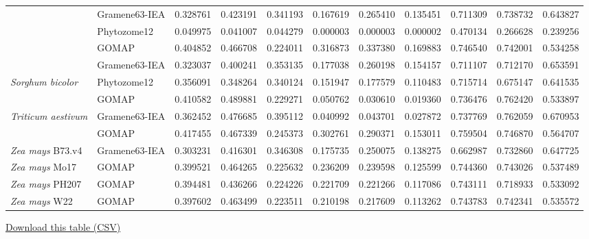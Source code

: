 \documentclass[utf8]{frontiersSCNS}
\begin{document}
\begin{table}[t]
{\begin{threeparttable}
\begin{tabular}{llrr>{}r|rr>{}r|rrr}
 & Gramene63-IEA & 0.328761 & 0.423191 & 0.341193 & 0.167619 & 0.265410 & 0.135451 & 0.711309 & 0.738732 & 0.643827\\

\rowcolor{gray!6}  \multirow{-3}{*}{\raggedright\arraybackslash \textit{Oryza sativa}} & Phytozome12 & 0.049975 & 0.041007 & 0.044279 & 0.000003 & 0.000003 & 0.000002 & 0.470134 & 0.266628 & 0.239256\\
\cmidrule{1-11}
 & GOMAP & 0.404852 & 0.466708 & 0.224011 & 0.316873 & 0.337380 & 0.169883 & 0.746540 & 0.742001 & 0.534258\\

\rowcolor{gray!6}   & Gramene63-IEA & 0.323037 & 0.400241 & 0.353135 & 0.177038 & 0.260198 & 0.154157 & 0.711107 & 0.712170 & 0.653591\\

\multirow{-3}{*}{\raggedright\arraybackslash \textit{Sorghum bicolor}} & Phytozome12 & 0.356091 & 0.348264 & 0.340124 & 0.151947 & 0.177579 & 0.110483 & 0.715714 & 0.675147 & 0.641535\\
\cmidrule{1-11}
\rowcolor{gray!6}   & GOMAP & 0.410582 & 0.489881 & 0.229271 & 0.050762 & 0.030610 & 0.019360 & 0.736476 & 0.762420 & 0.533897\\

\multirow{-2}{*}{\raggedright\arraybackslash \textit{Triticum aestivum}} & Gramene63-IEA & 0.362452 & 0.476685 & 0.395112 & 0.040992 & 0.043701 & 0.027872 & 0.737769 & 0.762059 & 0.670953\\
\cmidrule{1-11}
\rowcolor{gray!6}   & GOMAP & 0.417455 & 0.467339 & 0.245373 & 0.302761 & 0.290371 & 0.153011 & 0.759504 & 0.746870 & 0.564707\\

\multirow{-2}{*}{\raggedright\arraybackslash \textit{Zea mays} B73.v4} & Gramene63-IEA & 0.303231 & 0.416301 & 0.346308 & 0.175735 & 0.250075 & 0.138275 & 0.662987 & 0.732860 & 0.647725\\
\cmidrule{1-11}
\rowcolor{gray!6}  \textit{Zea mays} Mo17 & GOMAP & 0.399521 & 0.464265 & 0.225632 & 0.236209 & 0.239598 & 0.125599 & 0.744360 & 0.743026 & 0.537489\\
\cmidrule{1-11}
\textit{Zea mays} PH207 & GOMAP & 0.394481 & 0.436266 & 0.224226 & 0.221709 & 0.221266 & 0.117086 & 0.743111 & 0.718933 & 0.533092\\
\cmidrule{1-11}
\rowcolor{gray!6}  \textit{Zea mays} W22 & GOMAP & 0.397602 & 0.463499 & 0.223511 & 0.210198 & 0.217609 & 0.113262 & 0.743783 & 0.742341 & 0.535572\\
\bottomrule
\end{tabular}
\begin{tablenotes}
\item \href{https://raw.githubusercontent.com/Dill-PICL/GOMAP-Paper-2019.1/master/analyses/quality/results/quality_table.csv}{Download this table (CSV)}
\end{tablenotes}
\end{threeparttable}}
\end{table}


\end{document}
